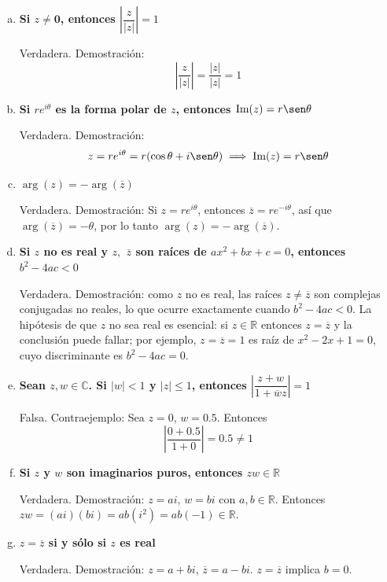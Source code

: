 \begin{prob}
\begin{myproof}
\begin{enumerate}[a)]
Falsa.  
Contraejemplo: Sea $z = 2i$, $w = 3i$. Entonces $zw = (2i)(3i) = 6i^2 = -6$, que es real, no imaginario puro.

\item \textbf{Si $z\neq \mathbf{0}$, entonces $\left|\dfrac{z}{|z|}\right|=1$}

Verdadera.  
Demostración:  
\[
\left|\frac{z}{|z|}\right| = \frac{|z|}{|z|} = 1
\]

\item \textbf{Si $re^{i\theta}$ es la forma polar de $z$, entonces $\text{Im}(z)=r\sen \theta$}

Verdadera.  
Demostración:  
\[
z = re^{i\theta} = r(\cos\theta + i\sen\theta) \implies \text{Im}(z) = r\sen\theta
\]

\item \textbf{$\arg(z)=-\arg(\overline{z})$}

Verdadera.  
Demostración: Si $z = re^{i\theta}$, entonces $\overline{z} = re^{-i\theta}$, así que $\arg(\overline{z}) = -\theta$, por lo tanto $\arg(z) = -\arg(\overline{z})$.

\item \textbf{Si $z$ no es real y $z,$ $\overline{z}$ son raíces de $ax^2+bx+c=0$, entonces $b^2-4ac<0$}

Verdadera.
Demostración: como $z$ no es real, las raíces $z\neq\overline{z}$ son complejas conjugadas no reales, lo que ocurre exactamente cuando $b^2-4ac<0$. La hipótesis de que $z$ no sea real es esencial: si $z\in\mathbb{R}$ entonces $z=\overline{z}$ y la conclusión puede fallar; por ejemplo, $z=\overline{z}=1$ es raíz de $x^2-2x+1=0$, cuyo discriminante es $b^2-4ac=0$.

\item \textbf{Sean $z, w\in \mathbb{C}$. Si $|w|<1$ y $|z|\leq 1$, entonces $\left|\dfrac{z+w}{1+\overline{w}z}\right|=1$}

Falsa.  
Contraejemplo: Sea $z=0$, $w=0.5$. Entonces
\[
\left|\frac{0+0.5}{1+0}\right| = 0.5 \neq 1
\]

\item \textbf{Si $z$ y $w$ son imaginarios puros, entonces $zw\in \mathbb{R}$}

Verdadera.  
Demostración: $z=ai$, $w=bi$ con $a,b\in\mathbb{R}$. Entonces $zw = (ai)(bi) = ab(i^2) = ab(-1) \in \mathbb{R}$.

\item \textbf{$z=\overline{z}$ si y sólo si $z$ es real}

Verdadera.  
Demostración: $z=a+bi$, $\overline{z}=a-bi$. $z=\overline{z}$ implica $b=0$.


\end{enumerate}
\end{myproof}
\end{prob}
